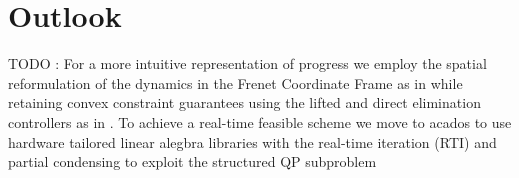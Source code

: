 \documentclass[conference]{IEEEtran}
\begin{document}
\section{Outlook}\label{Section7}
\par TODO : For a more intuitive representation of progress we employ the spatial reformulation of the dynamics in the Frenet Coordinate Frame as in \cite{arrizabalaga_towards_2022} while retaining convex constraint guarantees using the lifted and direct elimination controllers as in \cite{reiter_frenet-cartesian_2023}.
To achieve a real-time feasible scheme we move to acados \cite{verschueren_acados_2020} to use hardware tailored linear alegbra libraries \cite{frison_blasfeo_2018} with the real-time iteration \cite{gros_linear_2020} (RTI) and partial condensing to exploit the structured QP subproblem \cite{frison_hpipm_2020} 


\end{document}
